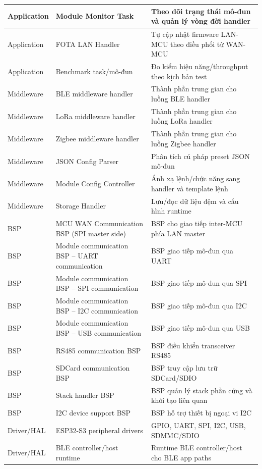 \begin{longtable}{|p{}|p{}|p{}|}
                Application & Module Monitor Task & Theo dõi trạng thái mô-đun và quản lý vòng đời handler \\ \hline
                Application & FOTA LAN Handler & Tự cập nhật firmware LAN-MCU theo điều phối từ WAN-MCU \\ \hline
                Application & Benchmark task/mô-đun & Đo kiểm hiệu năng/throughput theo kịch bản test \\ \hline
                Middleware & BLE middleware handler & Thành phần trung gian cho luồng BLE handler \\ \hline
                Middleware & LoRa middleware handler & Thành phần trung gian cho luồng LoRa handler \\ \hline
                Middleware & Zigbee middleware handler & Thành phần trung gian cho luồng Zigbee handler \\ \hline
                Middleware & JSON Config Parser & Phân tích cú pháp preset JSON mô-đun \\ \hline
                Middleware & Module Config Controller & Ánh xạ lệnh/chức năng sang handler và template lệnh \\ \hline
                Middleware & Storage Handler & Lưu/đọc dữ liệu đệm và cấu hình runtime \\ \hline
                BSP & MCU WAN Communication BSP (SPI master side) & BSP cho giao tiếp inter-MCU phía LAN master \\ \hline
                BSP & Module communication BSP -- UART communication & BSP giao tiếp mô-đun qua UART \\ \hline
                BSP & Module communication BSP -- SPI communication & BSP giao tiếp mô-đun qua SPI \\ \hline
                BSP & Module communication BSP -- I2C communication & BSP giao tiếp mô-đun qua I2C \\ \hline
                BSP & Module communication BSP -- USB communication & BSP giao tiếp mô-đun qua USB \\ \hline
                BSP & RS485 communication BSP & BSP điều khiển transceiver RS485 \\ \hline
                BSP & SDCard communication BSP & BSP truy cập lưu trữ SDCard/SDIO \\ \hline
                BSP & Stack handler BSP & BSP quản lý stack phần cứng và khởi tạo liên quan \\ \hline
                BSP & I2C device support BSP & BSP hỗ trợ thiết bị ngoại vi I2C \\ \hline
                Driver/HAL & ESP32-S3 peripheral drivers & GPIO, UART, SPI, I2C, USB, SDMMC/SDIO \\ \hline
                Driver/HAL & BLE controller/host runtime & Runtime BLE controller/host cho BLE app paths \\ \hline
            \end{longtable}
        
